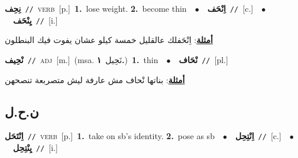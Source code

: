 \documentclass[10pt,a4paper,twoside]{article} %
\begin{document}
\begin{multicols}{2}
{\setlength\topsep{0pt}\textbf{\foreignlanguage{arabic}{نِحِف}}\ {\color{gray}\texttt{//}\color{black}}\ \textsc{verb}\ [p.]\ \textbf{1.}~lose weight.  \textbf{2.}~become thin\ \ $\bullet$\ \ \setlength\topsep{0pt}\textbf{\foreignlanguage{arabic}{اِنْحَف}}\ {\color{gray}\texttt{//}\color{black}}\ [c.]\ \ $\bullet$\ \ \setlength\topsep{0pt}\textbf{\foreignlanguage{arabic}{يِنْحَف}}\ {\color{gray}\texttt{//}\color{black}}\ [i.]\  \begin{flushright}\color{gray}\foreignlanguage{arabic}{\textbf{\underline{\foreignlanguage{arabic}{أمثلة}}}: اِنْحَفلك عالقليل خمسة كيلو عشان يفوت فيك البنطلون}\end{flushright}\color{black}} \vspace{2mm}

{\setlength\topsep{0pt}\textbf{\foreignlanguage{arabic}{نْحِيف}}\ {\color{gray}\texttt{//}\color{black}}\ \textsc{adj}\ [m.]\ \color{gray}(msa. \foreignlanguage{arabic}{نَحِيل}~\foreignlanguage{arabic}{\textbf{١.}})\color{black}\ \textbf{1.}~thin\ \ $\bullet$\ \ \setlength\topsep{0pt}\textbf{\foreignlanguage{arabic}{نْحَاف}}\ {\color{gray}\texttt{//}\color{black}}\ [pl.]\  \begin{flushright}\color{gray}\foreignlanguage{arabic}{\textbf{\underline{\foreignlanguage{arabic}{أمثلة}}}: بناتها نْحاف مش عارفة ليش متصربعة تنصحهن}\end{flushright}\color{black}} \vspace{2mm}

\vspace{-3mm}
\subsection*{\color{blue}\foreignlanguage{arabic}{ن.ح.ل}\color{blue}{}} 

{\setlength\topsep{0pt}\textbf{\foreignlanguage{arabic}{اِنْتَحَل}}\ {\color{gray}\texttt{//}\color{black}}\ \textsc{verb}\ [p.]\ \textbf{1.}~take on sb's identity.  \textbf{2.}~pose as sb\ \ $\bullet$\ \ \setlength\topsep{0pt}\textbf{\foreignlanguage{arabic}{اِنْتِحِل}}\ {\color{gray}\texttt{//}\color{black}}\ [c.]\ \ $\bullet$\ \ \setlength\topsep{0pt}\textbf{\foreignlanguage{arabic}{يِنْتِحِل}}\ {\color{gray}\texttt{//}\color{black}}\ [i.]\ } \vspace{2mm}


\end{multicols}
\end{document}
